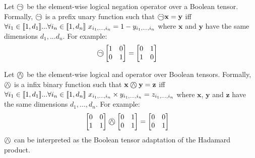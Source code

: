 \begin{definition}
	Let $\incircbin{\neg}$ be the element-wise logical negation operator over a Boolean tensor. Formally, $\incircbin{\neg}$ is a prefix unary function such that $\incircbin{\neg}\mathbf{x}=\mathbf{y}$ iff $\forall i_1\in[\![{1,d_1}]\!]...\forall i_n\in[\![{1,d_n}]\!]\ x_{i_1,...,i_n}=1-y_{i_1,...,i_n}$ where $\mathbf{x}$ and $\mathbf{y}$ have the same dimensions $d_1,...d_n$.
	\linespace
	For example:
	\begin{align*}
		\incircbin{\neg}
		\begin{bmatrix}
		1&0\\
		0&1\\
		\end{bmatrix}&=
		\begin{bmatrix}
			0&1\\
			1&0\\
		\end{bmatrix}
	\end{align*}
\end{definition}

\begin{definition}
	Let $\incircbin{\land}$ be the element-wise logical and operator over Boolean tensors. Formally, $\incircbin{\land}$ is a infix binary function such that $\mathbf{x}\incircbin{\land}\mathbf{y}=\mathbf{z}$ iff $\forall i_1\in[\![{1,d_1}]\!]...\forall i_n\in[\![{1,d_n}]\!]\ x_{i_1,...,i_n}\times y_{i_1,...,i_n}=z_{i_1,...,i_n}$ where $\mathbf{x}$, $\mathbf{y}$ and $\mathbf{z}$ have the same dimensions $d_1,...,d_n$.
	\linespace
	For example:
	\begin{align*}
	\begin{bmatrix}
	0&0\\
	1&1\\
	\end{bmatrix}
	\incircbin{\land}
	\begin{bmatrix}
	0&1\\
	0&1\\
	\end{bmatrix}
	&=
	\begin{bmatrix}
	0&0\\
	0&1\\
	\end{bmatrix}
	\end{align*}
	\linespace
	$\incircbin{\land}$ can be interpreted as the Boolean tensor adaptation of the Hadamard product.
\end{definition}

